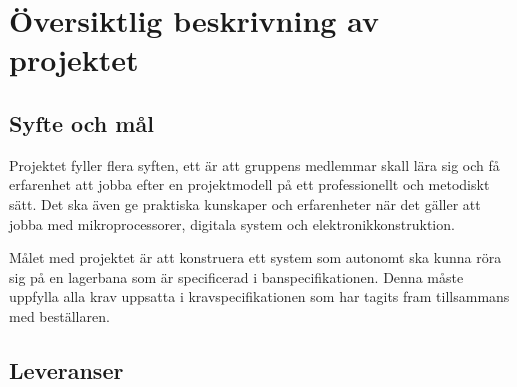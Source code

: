 \section{Översiktlig beskrivning av projektet}


\subsection{Syfte och mål}
Projektet fyller flera syften, ett är att gruppens medlemmar skall lära sig och få erfarenhet att jobba efter en projektmodell på ett professionellt och metodiskt sätt. Det ska även ge praktiska kunskaper och erfarenheter när det gäller att jobba med mikroprocessorer, digitala system och elektronikkonstruktion. 

Målet med projektet är att konstruera ett system som autonomt ska kunna röra sig på en lagerbana som är specificerad i banspecifikationen. Denna måste uppfylla alla krav uppsatta i kravspecifikationen som har tagits fram tillsammans med beställaren.

\subsection{Leveranser}

